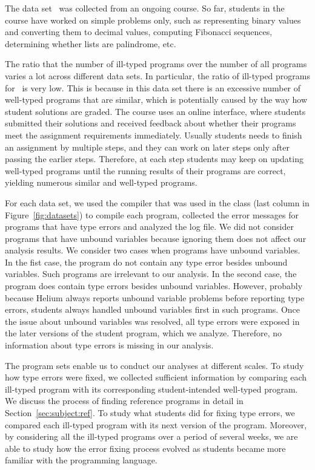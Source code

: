 \documentclass[12pt]{report}	%
\begin{document}
The data set \benchl\ was collected from an ongoing course. So far,
students in the course have worked on simple problems only, such as
representing binary values and converting them to decimal values,
computing Fibonacci sequences, determining whether lists are palindrome,
etc.

The ratio that the number of ill-typed programs
over the number of all programs
varies a lot across different data sets. In particular,
the ratio of ill-typed programs
for \benchl\ is very low. 
This is because in this data set there is an
excessive number of well-typed programs that are similar,
which is potentially caused by 
the way how student
solutions are graded. The course uses an online
interface, where students submitted their solutions and received
feedback about whether their programs meet the assignment requirements immediately.
Usually students needs to finish an assignment by multiple steps,
and they can work on later steps only after passing the earlier steps.
Therefore, at each step students may keep on updating well-typed programs
until the running results of their programs are correct, yielding numerous
similar and well-typed programs.

For each data set, we used the compiler that was used in the class (last column in Figure~\ref{fig:datasets})
%
to compile each program,
collected the error messages for programs that have type
errors 
and analyzed the log file.
We did not consider programs that have unbound variables
because ignoring them does not affect our analysis results. 
We consider two cases when programs have unbound variables. 
In the fist case, 
%
the program do not contain any type error besides 
unbound variables. Such programs are irrelevant to 
our analysis. In the second case, the program does
contain type errors besides unbound variables. 
%
However, probably because Helium always reports 
unbound variable problems before reporting
type errors, students
always handled unbound variables first in such 
programs. Once the issue about unbound variables
was resolved, all type errors were exposed 
in the later versions of the student program, which we analyze.
Therefore, no information about type errors is missing
in our analysis. 

The program sets enable us to conduct our analyses 
at different scales.
To study how type errors were fixed,
we collected sufficient information 
by comparing each ill-typed program with its
corresponding student-intended well-typed program.
We discuss the
process of finding reference programs in detail in
Section~\ref{sec:subject:ref}.
%
To study what students did for fixing type errors,
we compared each ill-typed program with its next version of the program.
Moreover, by considering all the ill-typed programs over a period of several weeks,
we are able to study how the error fixing process evolved as students became more
familiar with the programming language.
\end{document}
